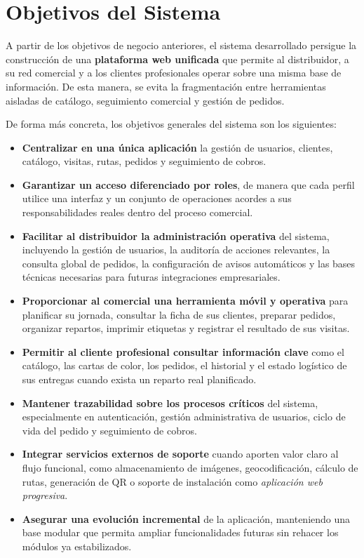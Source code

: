 \section{Objetivos del Sistema}
\label{sec:SystemObjectives}

A partir de los objetivos de negocio anteriores, el sistema desarrollado persigue la construcción de una \textbf{plataforma web unificada} que permite al distribuidor, a su red comercial y a los clientes profesionales operar sobre una misma base de información. De esta manera, se evita la fragmentación entre herramientas aisladas de catálogo, seguimiento comercial y gestión de pedidos.

De forma más concreta, los objetivos generales del sistema son los siguientes:

\begin{itemize}
    \item \textbf{Centralizar en una única aplicación} la gestión de usuarios, clientes, catálogo, visitas, rutas, pedidos y seguimiento de cobros.
    \item \textbf{Garantizar un acceso diferenciado por roles}, de manera que cada perfil utilice una interfaz y un conjunto de operaciones acordes a sus responsabilidades reales dentro del proceso comercial.
    \item \textbf{Facilitar al distribuidor la administración operativa} del sistema, incluyendo la gestión de usuarios, la auditoría de acciones relevantes, la consulta global de pedidos, la configuración de avisos automáticos y las bases técnicas necesarias para futuras integraciones empresariales.
    \item \textbf{Proporcionar al comercial una herramienta móvil y operativa} para planificar su jornada, consultar la ficha de sus clientes, preparar pedidos, organizar repartos, imprimir etiquetas y registrar el resultado de sus visitas.
    \item \textbf{Permitir al cliente profesional consultar información clave} como el catálogo, las cartas de color, los pedidos, el historial y el estado logístico de sus entregas cuando exista un reparto real planificado.
    \item \textbf{Mantener trazabilidad sobre los procesos críticos} del sistema, especialmente en autenticación, gestión administrativa de usuarios, ciclo de vida del pedido y seguimiento de cobros.
    \item \textbf{Integrar servicios externos de soporte} cuando aporten valor claro al flujo funcional, como almacenamiento de imágenes, geocodificación, cálculo de rutas, generación de QR o soporte de instalación como \textit{aplicación web progresiva}.
    \item \textbf{Asegurar una evolución incremental} de la aplicación, manteniendo una base modular que permita ampliar funcionalidades futuras sin rehacer los módulos ya estabilizados.
\end{itemize}
